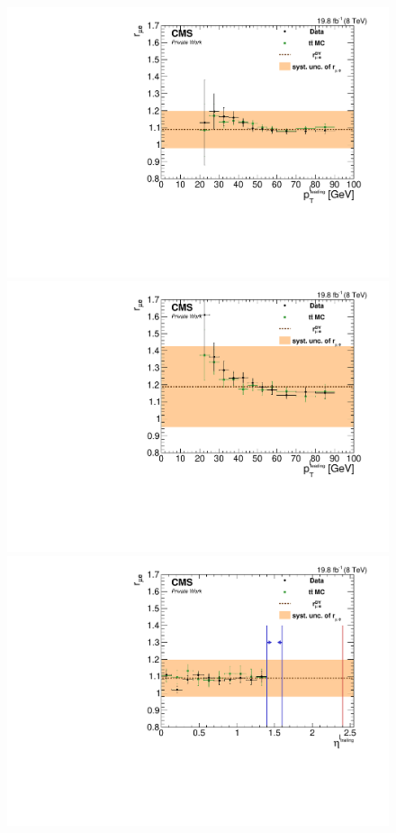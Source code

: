 \begin{figure}[htbp]
\begin{minipage}[t]{0.49\textwidth}
  \includegraphics[width=\textwidth]{plots/BG/rmue/8TeVrRatioDataVsMCControl_pt2_Central_Full2012.pdf}
\end{minipage}
\begin{minipage}[t]{0.49\textwidth}
\includegraphics[width=\textwidth]{plots/BG/rmue/8TeVrRatioDataVsMCControl_pt2_Forward_Full2012.pdf}
\end{minipage}
\begin{minipage}[t]{0.49\textwidth}
  \includegraphics[width=\textwidth]{plots/BG/rmue/8TeVrRatioDataVsMCControl_eta1_Central_Full2012.pdf}

\end{minipage}
\end{figure}
